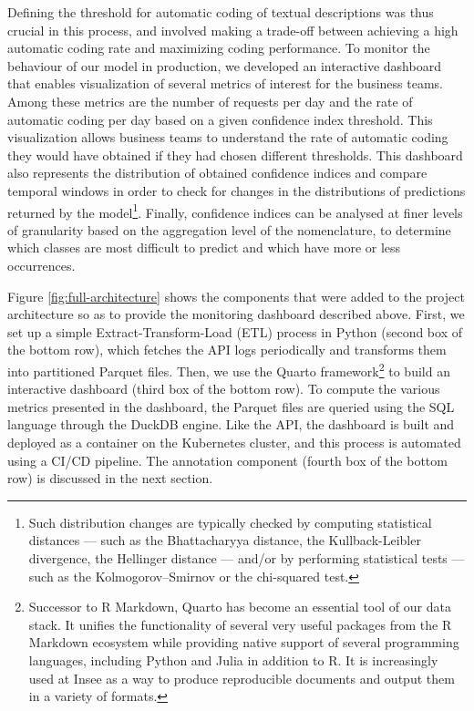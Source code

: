 \documentclass[graybox]{svmult}
\begin{document}
Defining the threshold for automatic coding of textual descriptions was thus crucial in this process, and involved making a trade-off between achieving a high automatic coding rate and maximizing coding performance. To monitor the behaviour of our model in production, we developed an interactive dashboard that enables visualization of several metrics of interest for the business teams. Among these metrics are the number of requests per day and the rate of automatic coding per day based on a given confidence index threshold. This visualization allows business teams to understand the rate of automatic coding they would have obtained if they had chosen different thresholds. This dashboard also represents the distribution of obtained confidence indices and compare temporal windows in order to check for changes in the distributions of predictions returned by the model\footnote{Such distribution changes are typically checked by computing statistical distances — such as the Bhattacharyya distance, the Kullback-Leibler divergence, the Hellinger distance — and/or by performing statistical tests — such as the Kolmogorov–Smirnov or the chi-squared test.}. Finally, confidence indices can be analysed at finer levels of granularity based on the aggregation level of the nomenclature, to determine which classes are most difficult to predict and which have more or less occurrences.

Figure \ref{fig:full-architecture} shows the components that were added to the project architecture so as to provide the monitoring dashboard described above. First, we set up a simple Extract-Transform-Load (ETL) process in Python (second box of the bottom row), which fetches the API logs periodically and transforms them into partitioned Parquet files. Then, we use the Quarto framework\footnote{Successor to R Markdown, Quarto has become an essential tool of our data stack. It unifies the functionality of several very useful packages from the R Markdown ecosystem while providing native support of several programming languages, including Python and Julia in addition to R. It is increasingly used at Insee as a way to produce reproducible documents and output them in a variety of formats.} to build an interactive dashboard (third box of the bottom row). To compute the various metrics presented in the dashboard, the Parquet files are queried using the SQL language through the DuckDB engine. Like the API, the dashboard is built and deployed as a container on the Kubernetes cluster, and this process is automated using a CI/CD pipeline. The annotation component (fourth box of the bottom row) is discussed in the next section.
\end{document}
